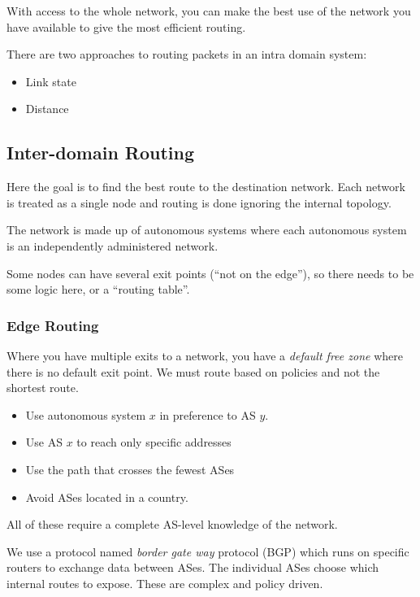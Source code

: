 With access to the whole network, you can make the best use of the network you have available to give the most efficient routing.

There are two approaches to routing packets in an intra domain system:
\begin{itemize}
	\item Link state
	\item Distance
\end{itemize}

\subsection{Inter-domain Routing}\label{sub:inter_domain_routing}

Here the goal is to find the best route to the destination network.
Each network is treated as a single node and routing is done ignoring the internal topology.

The network is made up of autonomous systems where each autonomous system is an independently administered network.

\begin{note}
	Some nodes can have several exit points (``not on the edge''), so there needs to be some logic here, or a ``routing table''.
\end{note}

\subsubsection{Edge Routing}\label{ssub:edge_routing}

Where you have multiple exits to a network, you have a \emph{default free zone} where there is no default exit point.
We must route based on policies and not the shortest route.
\begin{itemize}
	\item Use autonomous system \(x\) in preference to AS \(y\).
	\item Use AS \(x\) to reach only specific addresses
	\item Use the path that crosses the fewest ASes
	\item Avoid ASes located in a country.
\end{itemize}
All of these require a complete AS-level knowledge of the network.

We use a protocol named \emph{border gate way} protocol (BGP) which runs on specific routers to exchange data between ASes.
The individual ASes choose which internal routes to expose.
These are complex and policy driven.

